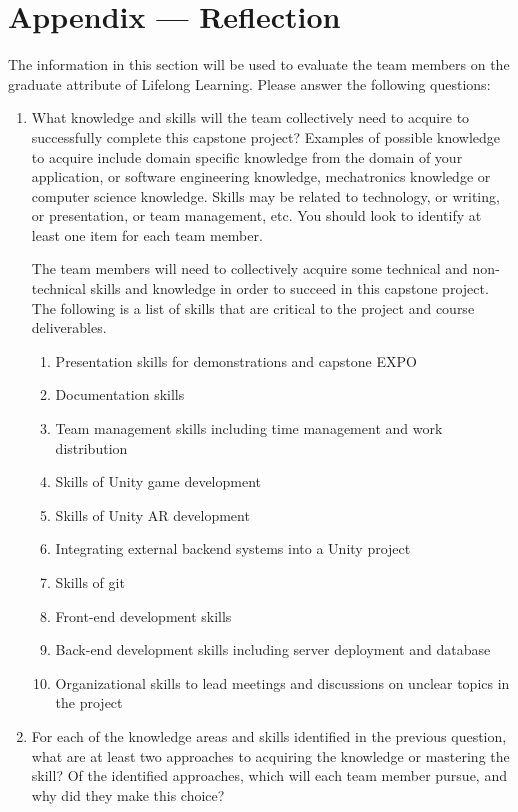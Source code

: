 \documentclass[12pt]{article}
\begin{document}
\newpage{}
\section*{Appendix --- Reflection}

The information in this section will be used to evaluate the team members on the
graduate attribute of Lifelong Learning.  Please answer the following questions:

\begin{enumerate}
  \item What knowledge and skills will the team collectively need to acquire to
  successfully complete this capstone project?  Examples of possible knowledge
  to acquire include domain specific knowledge from the domain of your
  application, or software engineering knowledge, mechatronics knowledge or
  computer science knowledge.  Skills may be related to technology, or writing,
  or presentation, or team management, etc.  You should look to identify at
  least one item for each team member.
  
  
\quad The team members will need to collectively acquire some technical and non-technical skills and knowledge in order to succeed in this capstone project. The following is a list of skills that are critical to the project and course deliverables.
  \begin{enumerate}[1]
      \item Presentation skills for demonstrations and capstone EXPO
      \item Documentation skills
      \item Team management skills including time management and work distribution
      \item Skills of Unity game development
      \item Skills of Unity AR development
      \item Integrating external backend systems into a Unity project
      \item Skills of git
      \item Front-end development skills
      \item Back-end development skills including server deployment and database
      \item Organizational skills to lead meetings and discussions on unclear topics in the project
  \end{enumerate}
  
  \item For each of the knowledge areas and skills identified in the previous
  question, what are at least two approaches to acquiring the knowledge or
  mastering the skill?  Of the identified approaches, which will each team
  member pursue, and why did they make this choice?
  

\end{enumerate}
\end{document}
